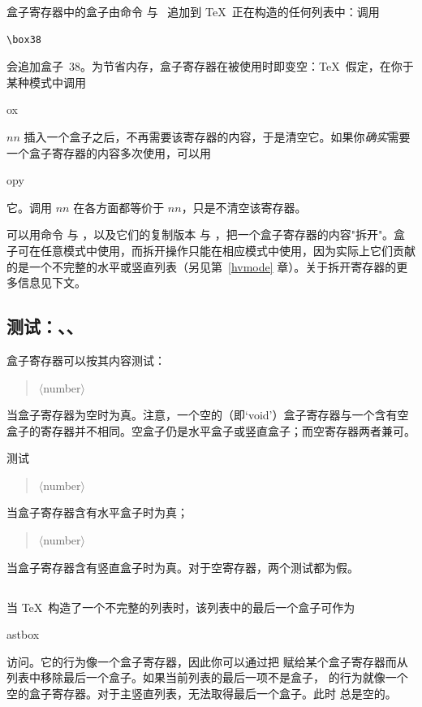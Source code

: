\documentclass[a4paper]{rapport3}
\makeatletter
\def\gr#1{$\langle$#1$\rangle$}\def\key#1{{\tt#1}}
\newenvironment{disp}{\begin{quotation}}{\end{quotation}}
\def\cstoidx#1\par{\index{#1@\cs{#1}}}
\def\csidx#1{\cstoidx #1\par\cs{#1}}
\makeatother
\begin{document}
盒子寄存器中的盒子由命令  与~ 追加到 \TeX\ 正在构造的任何列表中：调用
\begin{verbatim}
\box38
\end{verbatim}
会追加盒子~38。为节省内存，盒子寄存器在被使用时即变空：\TeX\ 假定，在你于某种模式中调用 \csidx{box}$nn$ 插入一个盒子之后，不再需要该寄存器的内容，于是清空它。如果你\emph{确实}需要一个盒子寄存器的内容多次使用，可以用 \csidx{copy} 它。调用 $nn$ 在各方面都等价于 $nn$，只是不清空该寄存器。

可以用命令  与 ，以及它们的复制版本  与 ，把一个盒子寄存器的内容"拆开"。盒子可在任意模式中使用，而拆开操作只能在相应模式中使用，因为实际上它们贡献的是一个不完整的水平或竖直列表（另见第~\ref{hvmode} 章）。关于拆开寄存器的更多信息见下文。
\awp

\subsection{测试：、、}

盒子寄存器可以按其内容测试：
\begin{disp}\gr{number}\end{disp}
当盒子寄存器为空时为真。注意，一个空的（即`void'）盒子寄存器与一个含有空盒子的寄存器并不相同。空盒子仍是水平盒子或竖直盒子；而空寄存器两者兼可。

测试
\begin{disp}\gr{number}\end{disp}
当盒子寄存器含有水平盒子时为真；
\begin{disp}\gr{number}\end{disp}
当盒子寄存器含有竖直盒子时为真。对于空寄存器，两个测试都为假。

\subsection{}
\label{lastbox}

当 \TeX\ 构造了一个不完整的列表时，该列表中的最后一个盒子可作为 \csidx{lastbox} 访问。它的行为像一个盒子寄存器，因此你可以通过把  赋给某个盒子寄存器而从列表中移除最后一个盒子。如果当前列表的最后一项不是盒子， 的行为就像一个空的盒子寄存器。对于主竖直列表，无法取得最后一个盒子。此时  总是空的。
\end{document}
